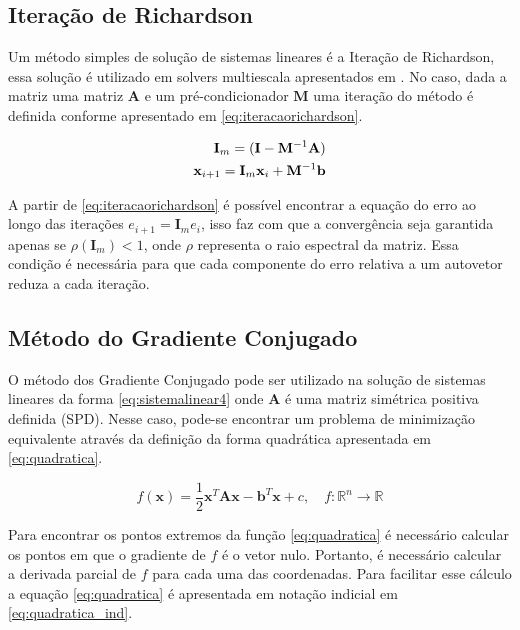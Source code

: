 \subsection{Iteração de Richardson}

Um método simples de solução de sistemas lineares é a Iteração de Richardson, essa solução é utilizado em solvers multiescala apresentados em \citet{msparalelo}. No caso, dada a matriz uma matriz $\mathbf{A}$ e um pré-condicionador $\mathbf{M}$ uma iteração do método é definida conforme apresentado em \eqref{eq:iteracaorichardson}.

\begin{align} \label{eq:iteracaorichardson}
\mathbf{I}_m = (\mathbf{I} - \mathbf{M}^{-1} \mathbf{A})    \\
\mathbf{x}_{i+1} = \mathbf{I}_m  \mathbf{x}_i + \mathbf{M}^{-1} \mathbf{b}  
\end{align}

A partir de \eqref{eq:iteracaorichardson} é possível encontrar a equação do erro ao longo das iterações $e_{i+1} = \mathbf{I}_m e_i$, isso faz com que a convergência seja garantida apenas se $\rho(\mathbf{I}_m) < 1$, onde $\rho$ representa o raio espectral da matriz. Essa condição é necessária para que cada componente do erro relativa a um autovetor reduza a cada iteração.


\subsection{Método do Gradiente Conjugado}

O método dos Gradiente Conjugado pode ser utilizado na solução de sistemas lineares da forma \eqref{eq:sistemalinear4} onde $\mathbf{A}$ é uma matriz simétrica positiva definida (SPD). Nesse caso, pode-se encontrar um problema de minimização equivalente através da definição da forma quadrática apresentada em \eqref{eq:quadratica}. 

\begin{equation} \label{eq:quadratica}
    f(\mathbf{x}) = \frac{1}{2}  \mathbf{x}^T \mathbf{A} \mathbf{x} - \mathbf{b}^T \mathbf{x} + c, \quad f:\mathbb{R}^n \rightarrow \mathbb{R}
\end{equation}

Para encontrar os pontos extremos da função \eqref{eq:quadratica} é necessário calcular os pontos em que o gradiente de $f$ é o vetor nulo. Portanto, é necessário calcular a derivada parcial de $f$ para cada uma das coordenadas. Para facilitar esse cálculo a equação \eqref{eq:quadratica} é apresentada em notação indicial em \eqref{eq:quadratica_ind}.



